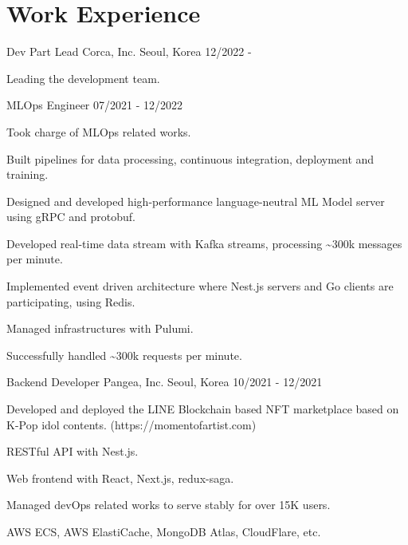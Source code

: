 \section{Work Experience}

\cventry
{Dev Part Lead} %
{Corca, Inc.} %
{Seoul, Korea} %
{12/2022 -} %
\begin{cvitems}
\item {Leading the development team.}
\end{cvitems}

\cventry
{MLOps Engineer} %
{} %
{} %
{07/2021 - 12/2022} %
\begin{cvitems}
\item {Took charge of MLOps related works.}
\item {Built pipelines for data processing, continuous integration, deployment and training.}
\item {Designed and developed high-performance language-neutral ML Model server using gRPC and protobuf.}
\item {Developed real-time data stream with Kafka streams, processing \textasciitilde 300k messages per minute.}
\item {Implemented event driven architecture where Nest.js servers and Go clients are participating, using Redis.}
\item {Managed infrastructures with Pulumi.}
\item {Successfully handled \textasciitilde 300k requests per minute.}
\end{cvitems}

\cventry
{Backend Developer} %
{Pangea, Inc.} %
{Seoul, Korea} %
{10/2021 - 12/2021} %
\begin{cvitems}
\item {Developed and deployed the LINE Blockchain based NFT marketplace based on K-Pop idol contents. (https://momentofartist.com)}
\item {RESTful API with Nest.js.}
\item {Web frontend with React, Next.js, redux-saga.}
\item {Managed devOps related works to serve stably for over 15K users.}
\item {AWS ECS, AWS ElastiCache, MongoDB Atlas, CloudFlare, etc.}
\end{cvitems}

